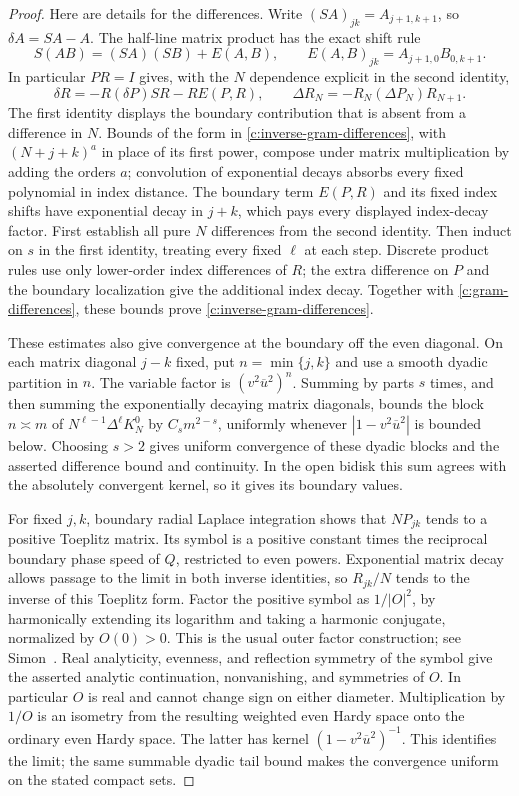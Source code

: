 \begin{proof}
Here are details for the differences.  Write
$(SA)_{jk}=A_{j+1,k+1}$, so $\delta A=SA-A$.  The half-line matrix
product has the exact shift rule
\[
 S(AB)=(SA)(SB)+E(A,B),\qquad
 E(A,B)_{jk}=A_{j+1,0}B_{0,k+1}.
\]
In particular $PR=I$ gives, with the $N$ dependence explicit in the
second identity,
\[
 \delta R=-R(\delta P)SR-R E(P,R),
 \qquad
 \Delta R_N=-R_N(\Delta P_N)R_{N+1}.
\]
The first identity displays the boundary contribution that is absent
from a difference in $N$.  Bounds of the form in
\eqref{c:inverse-gram-differences}, with $(N+j+k)^a$ in place of its
first power, compose under matrix multiplication by adding the orders
$a$; convolution of exponential decays absorbs every fixed polynomial
in index distance.  The boundary term $E(P,R)$ and its fixed index
shifts have exponential decay in $j+k$, which pays every displayed
index-decay factor.  First establish all pure $N$ differences from the
second identity.  Then induct on $s$ in the first identity, treating
every fixed $\ell$ at each step.  Discrete product rules use only
lower-order index differences of $R$; the extra difference on $P$ and
the boundary localization give the additional index decay.  Together
with \eqref{c:gram-differences}, these bounds prove
\eqref{c:inverse-gram-differences}.

These estimates also give convergence at the boundary off the even
diagonal.  On each matrix diagonal $j-k$ fixed, put
$n=\min\{j,k\}$ and use a smooth dyadic partition in $n$.
The variable factor is $(v^2\overline u^2)^n$.
Summing by parts $s$ times, and then summing the exponentially decaying
matrix diagonals, bounds the block $n\asymp m$ of
$N^{\ell-1}\Delta^\ell K_N^0$ by $C_sm^{2-s}$, uniformly whenever
$|1-v^2\overline u^2|$ is bounded below.  Choosing $s>2$ gives
uniform convergence of these dyadic blocks and the asserted difference
bound and continuity.  In the open bidisk this sum agrees with the
absolutely convergent kernel, so it gives its boundary values.

For fixed $j,k$, boundary radial Laplace integration shows that
$NP_{jk}$ tends to a positive Toeplitz matrix.  Its symbol is a
positive constant times the reciprocal boundary phase speed of $Q$,
restricted to even powers.  Exponential matrix decay allows passage
to the limit in both inverse identities, so $R_{jk}/N$ tends to the
inverse of this Toeplitz form.  Factor the positive symbol as
$1/|O|^2$, by harmonically extending its logarithm and taking a
harmonic conjugate, normalized by $O(0)>0$.  This is the usual outer
factor construction; see Simon~\cite[Section 5]{Simon2005Szego}.
Real analyticity,
evenness, and reflection symmetry of the symbol give the asserted
analytic continuation, nonvanishing, and symmetries of $O$.
In particular $O$ is real and cannot change sign on either diameter.
Multiplication by $1/O$ is an isometry from the resulting weighted
even Hardy space onto the ordinary even Hardy space.  The latter has
kernel $(1-v^2\overline u^2)^{-1}$.  This identifies the limit;
the same summable dyadic tail bound makes the convergence uniform on
the stated compact sets.
\end{proof}

